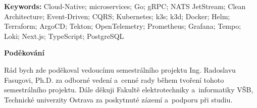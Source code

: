 \documentclass[11pt, a4paper, oneside]{article}
\begin{document}
\vspace{1em}
\noindent\textbf{Keywords:} Cloud-Native; microservices; Go; gRPC; NATS JetStream; Clean Architecture; Event-Driven; CQRS; Kubernetes; k3s; k3d; Docker; Helm; Terraform; ArgoCD; Tekton; OpenTelemetry; Prometheus; Grafana; Tempo; Loki; Next.js; TypeScript; PostgreSQL

\clearpage
\thispagestyle{empty}
\noindent
{\normalsize\textbf{Poděkování}}

\vspace{0.5em}

\noindent
Rád bych zde poděkoval vedoucímu semestrálního projektu Ing. Radoslavu Fasugovi, Ph.D. za odborné vedení a~cenné rady během tvoření tohoto semestrálního projektu.
Dále děkuji Fakultě elektrotechniky a~informatiky VŠB, Technické univerzity Ostrava za poskytnuté zázemí a~podporu při studiu.

\vspace*{1cm}

\clearpage
\tableofcontents

\listoffigures

\lstlistoflistings
\clearpage
\end{document}
